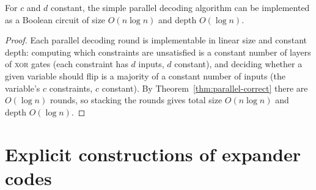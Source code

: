 \begin{proposition}
  \label{prop:parallel-circuit}
  For $c$ and $d$ constant, the simple parallel decoding algorithm can be
  implemented as a Boolean circuit of size $O(n\log n)$ and depth
  $O(\log n)$.
\end{proposition}
\begin{proof}
  Each parallel decoding round is implementable in linear size and constant
  depth: computing which constraints are unsatisfied is a constant number of
  layers of \textsc{xor} gates (each constraint has $d$ inputs, $d$ constant),
  and deciding whether a given variable should flip is a majority of a constant
  number of inputs (the variable's $c$ constraints, $c$ constant). By
  Theorem~\ref{thm:parallel-correct} there are $O(\log n)$ rounds, so stacking
  the rounds gives total size $O(n\log n)$ and depth $O(\log n)$.
\end{proof}

\chapter{Explicit constructions of expander codes}



